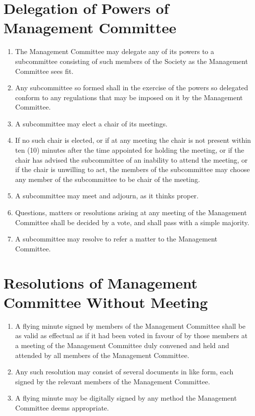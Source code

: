 \documentclass[a4paper]{article}
\begin{document}
\section{Delegation of Powers of Management Committee}
\begin{enumerate}
\item The Management Committee may delegate any of its powers to a subcommittee consisting of such members of the Society as the Management Committee sees fit.
\item Any subcommittee so formed shall in the exercise of the powers so delegated conform to any regulations that may be imposed on it by the Management Committee.
\item A subcommittee may elect a chair of its meetings.
\item If no such chair is elected, or if at any meeting the chair is not present within ten (10) minutes after the time appointed for holding the meeting, or if the chair has advised the subcommittee of an inability to attend the meeting, or if the chair is unwilling to act, the members of the subcommittee may choose any member of the subcommittee to be chair of the meeting.
\item A subcommittee may meet and adjourn, as it thinks proper.
\item Questions, matters or resolutions arising at any meeting of the Management Committee shall be decided by a vote, and shall pass with a simple majority.
\item A subcommittee may resolve to refer a matter to the Management Committee.
\end{enumerate}

\section{Resolutions of Management Committee Without Meeting}
\begin{enumerate}
\item A flying minute signed by members of the Management Committee shall be as valid as effectual as if it had been voted in favour of by those members at a meeting of the Management Committee duly convened and held and attended by all members of the Management Committee.
\item Any such resolution may consist of several documents in like form, each signed by the relevant members of the Management Committee.
\item A flying minute may be digitally signed by any method the Management Committee deems appropriate.
\end{enumerate}
\end{document}
